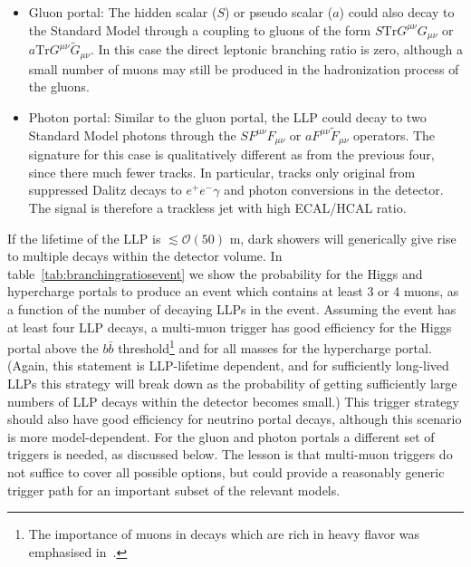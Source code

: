 \begin{itemize}
\item Gluon portal: The hidden scalar ($S$) or pseudo scalar ($a$) could also decay to the Standard Model through a coupling to gluons of the form $S \mathrm{Tr}G^{\mu\nu}G_{\mu\nu}$ or $a \mathrm{Tr}G^{\mu\nu}\tilde G_{\mu\nu}$. In this case the direct leptonic branching ratio is zero, although a small number of muons may still be produced in the hadronization process of the gluons. 

\item Photon portal: Similar to the gluon portal, the LLP could decay to two Standard Model photons through the $S F^{\mu\nu}F_{\mu\nu}$ or $a F^{\mu\nu}\tilde F_{\mu\nu}$ operators. The signature for this case is qualitatively different as from the previous four, since there much fewer tracks. In particular, tracks only original from suppressed Dalitz decays to $e^+e^-\gamma$ and photon conversions in the detector. The signal is therefore a trackless jet with high ECAL/HCAL ratio. 
\end{itemize}

If the lifetime of the LLP is $\lesssim \mathcal{O}(50)$ m, dark showers will generically give rise to multiple decays within the detector volume.  In table~\ref{tab:branchingratiosevent} we show the probability for the Higgs and hypercharge portals to produce an event which contains at least 3 or 4 muons, as a function of the number of decaying LLPs in the event. Assuming the event has at least four LLP decays, a multi-muon trigger has good efficiency for the Higgs portal above the $b\bar b$ threshold\footnote{The importance of muons in decays which are rich in heavy flavor was emphasised in~\cite{Strassler:2008fv}.} and for all masses for the hypercharge portal. (Again, this statement is LLP-lifetime dependent, and for sufficiently long-lived LLPs this strategy will break down as the probability of getting sufficiently large numbers of LLP decays within the detector becomes small.) This trigger strategy should also have good efficiency for  neutrino portal decays, although this scenario is more model-dependent. For the gluon and photon portals a different set of triggers is needed, as discussed below. The lesson is that multi-muon triggers do not suffice to cover all possible options, but could provide a reasonably generic trigger path for an important subset of the relevant models.

